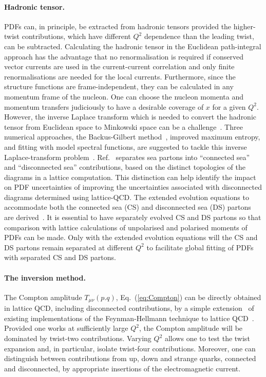 \paragraph*{Hadronic tensor.} 
PDFs can, in principle, be extracted from hadronic tensors provided the 
higher-twist contributions, which have different $Q^2$ dependence than the 
leading twist, can be subtracted. 
%
Calculating the hadronic tensor in the Euclidean path-integral approach
has the advantage that no renormalisation is required if conserved vector      
currents are used in the current-current correlation and only finite 
renormalisations are needed for the local currents.
%
Furthermore, since the structure functions are frame-independent, they 
can be calculated in any momentum frame of the nucleon. 
%
One can choose the nucleon momenta and momentum transfers judiciously 
to have a desirable coverage of $x$ for a given $Q^2$. 
%
However, the inverse Laplace transform which is needed to convert the hadronic tensor from Euclidean space to Minkowski space can be a 
challenge~\cite{Liu:1993cv,Liu:1999ak}. 
%
Three numerical approaches, the Backus-Gilbert method~\cite{Hansen:2017mnd}, 
improved maximum entropy, and fitting with model spectral functions, 
are suggested to tackle this inverse Laplace-transform 
problem~\cite{Liu:2016djw}. 
%
Ref.~\cite{Liu:1993cv} separates sea partons into ``connected sea'' and 
``disconnected sea'' contributions, based on the distinct topologies of the 
diagrams in a lattice computation. 
%
This distinction can help identify the impact on PDF uncertainties of 
improving the uncertainties associated with disconnected diagrams determined 
using lattice-QCD.
%
The extended evolution equations to accommodate both the connected sea 
(CS) and disconnected sea (DS) partons are derived~\cite{Liu:2017lpe}.
%
It is essential to have separately evolved CS and DS partons so that 
comparison with lattice calculations of unpolarised and polarised moments of
PDFs can be made. 
%
Only with the extended evolution equations will the CS and DS partons 
remain separated at different $Q^2$ to facilitate global fitting 
of PDFs with separated CS and DS partons.

\paragraph*{The inversion method.} 
\label{Sec:InversionMethod}

The Compton amplitude $T_{\mu\nu}(p.q)$, Eq.~(\ref{eq:Compton}) can be
directly obtained in lattice QCD, including disconnected contributions,  by a simple extension~\cite{Chambers:2017dov} of existing implementations of the Feynman-Hellmann technique to lattice QCD~\cite{Horsley:2012pz,Chambers:2014qaa,Chambers:2015bka}.
%
Provided one works at sufficiently large $Q^2$, the Compton amplitude will be dominated by twist-two contributions.
%
Varying $Q^2$ allows one to test the twist expansion and, in particular, isolate twist-four contributions. Moreover, one can distinguish between contributions from up, down and strange quarks, connected and disconnected, by appropriate insertions of the electromagnetic current.

